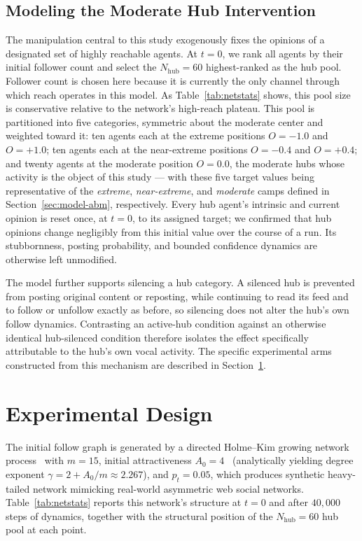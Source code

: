 \documentclass{svproc}
\def\dgreen#1{\textcolor[rgb]{0.02,0.50,0.05}{#1}}
\def\Black{\color[rgb]{0,0,0}}
\begin{document}
\subsection{Modeling the Moderate Hub Intervention}\label{sec:model-intervention}
The manipulation central to this study exogenously fixes the opinions
of a designated set of highly reachable agents. At $t=0$, we rank all
agents by their initial follower count and select the
$N_{\mathrm{hub}}=60$ highest-ranked as the hub pool. Follower count
is chosen here because it is currently the only channel through which
reach operates in this model. 
\dgreen{As Table~\ref{tab:netstats} shows, this
pool size is conservative relative to the network's high-reach
plateau.} 
This pool is partitioned
into five categories, symmetric about the moderate center and weighted
toward it: ten agents each at the extreme positions $O=-1.0$ and
$O=+1.0$; ten agents each at the near-extreme positions $O=-0.4$ and
$O=+0.4$; and twenty agents at the moderate position $O=0.0$, the
moderate hubs whose activity is the object of this study --- with
these five target values being representative of the \emph{extreme},
\emph{near-extreme}, and \emph{moderate} camps defined in
Section~\ref{sec:model-abm}, respectively. Every hub agent's intrinsic
and current opinion is reset once, at $t=0$, to its assigned
target; we confirmed that hub opinions change negligibly from
this initial value over the course of a run. Its stubbornness, posting
probability, and bounded confidence dynamics are otherwise left
unmodified.
\par

The model further supports silencing a hub category. A silenced hub is
prevented from posting original content or reposting, while continuing
to read its feed and to follow or unfollow exactly as before, so
silencing does not alter the hub's own follow dynamics.
Contrasting an active-hub condition against an otherwise
identical hub-silenced condition therefore isolates the effect
specifically attributable to the hub's own vocal activity. The
specific experimental arms constructed from this mechanism are
described in Section~\ref{sec:experiments}.
\par

%
\Black%
%

\section{Experimental Design}\label{sec:experiments}

The initial follow graph is generated by a directed
Holme--Kim growing network process~\cite{holme2002}
with $m=15$, initial attractiveness $A_0=4$~\cite{dorogovtsev2000}
(analytically yielding degree exponent $\gamma=2+A_0/m\approx2.267$),
and $p_t=0.05$, which produces
synthetic heavy-tailed network mimicking real-world
asymmetric web social networks. Table~\ref{tab:netstats} reports this
network's structure at $t=0$ and after $40{,}000$ steps of dynamics,
together with the structural position of the $N_{\mathrm{hub}}=60$
hub pool at each point.
\end{document}
